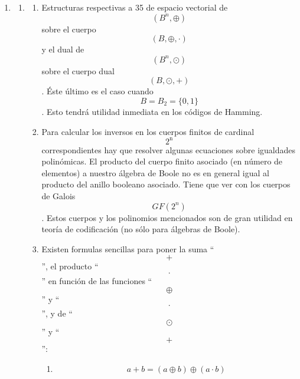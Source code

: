 \begin{enumerate}
\def\labelenumi{\arabic{enumi}.}
\item
  \begin{enumerate}
  \def\labelenumii{\arabic{enumii}.}
  \item
    \begin{enumerate}
    \def\labelenumiii{\arabic{enumiii}.}
    \item
      Estructuras respectivas a 35 de espacio vectorial
      de\[({B^{n}, \oplus})\]sobre el cuerpo \[({B, \oplus , \cdot})\] y
      el dual de \[({B^{n}, \odot})\]sobre el cuerpo dual
      \[({B, \odot , +})\]. Éste último es el caso cuando
      \[{B = B_{2}} = {\{ 0,1\}}\]. Esto tendrá utilidad inmediata en
      los códigos de Hamming.
    \item
      Para calcular los inversos en los cuerpos finitos de cardinal
      \[2^{\mathbf{\mathrm{n}}}\] correspondientes hay que re\-solver
      algunas ecuaciones sobre igualdades polinómicas. El producto del
      cuerpo fi\-nito asociado (en número de elementos) a nuestro
      álgebra de Boole no es en general igual al producto del ani\-llo
      booleano asociado. Tiene que ver con los cuerpos de Galois
      \[\mathit{GF}{(2^{n})}\]. Estos cuerpos y los polinomios
      mencionados son de gran utilidad en teoría de codificación (no
      sólo para álgebras de Boole).
    \item
      Existen formulas sencillas para poner la suma ``\[+\]'', el
      producto ``\[\cdot\]'' en fun\-ción de las funciones
      ``\[\oplus\]'' y ``\[\cdot\]'', y de ``\[\odot\]'' y ``\[+\]'':

      \begin{enumerate}
      \def\labelenumiv{\arabic{enumiv}.}
      \item
        \[{{a + b} = {({a \oplus b})}} \oplus {({a \cdot b})}\]


\end{enumerate}
\end{enumerate}
\end{enumerate}
\end{enumerate}
